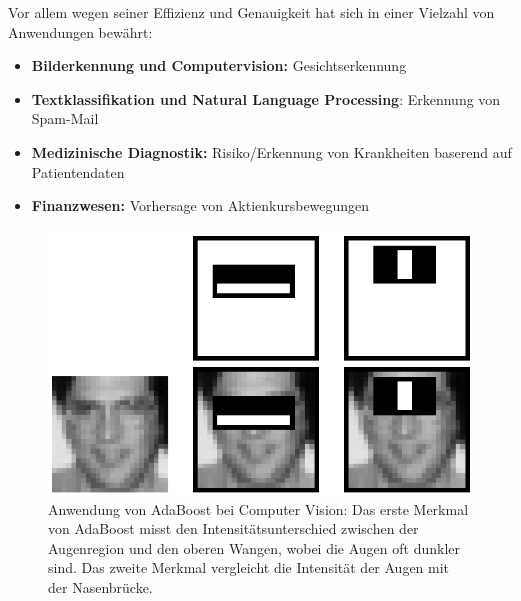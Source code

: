 Vor allem wegen seiner Effizienz und Genauigkeit hat sich  in einer Vielzahl
von Anwendungen bewährt:
\begin{itemize}
    \item \textbf{Bilderkennung und Computervision:} Gesichtserkennung~\cite{viola2001rapid}
    \item \textbf{Textklassifikation und Natural Language Processing}: Erkennung von Spam-Mail~\cite{panwar2022detection}
    \item \textbf{Medizinische Diagnostik:} Risiko/Erkennung von Krankheiten baserend auf Patientendaten~\cite{hatwell2020ada}
    \item \textbf{Finanzwesen:} Vorhersage von Aktienkursbewegungen~\cite{zhang2016stock}
\end{itemize}
\begin{figure}
    \centering
    \includegraphics[width=.65\textwidth]{figures/CV_Example.png}
    \caption{Anwendung von AdaBoost bei Computer Vision:
        Das erste Merkmal von AdaBoost misst den Intensitätsunterschied
        zwischen der Augenregion und den oberen Wangen,
        wobei die Augen oft dunkler sind. Das zweite Merkmal vergleicht die
        Intensität der Augen mit der Nasenbrücke.\cite{viola2001rapid}}
\end{figure}